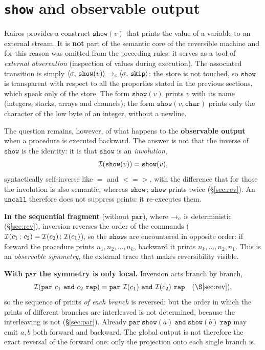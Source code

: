 \section{\texttt{show} and observable output}
\label{sec:show}

Kairos provides a construct $\mathtt{show}(v)$ that prints the value of a
variable to an external stream. It is \textbf{not} part of the semantic core of the
reversible machine and for this reason was omitted from the preceding rules: it serves
as a tool of \emph{external observation} (inspection of values during
execution). The associated transition is simply
$\langle \sigma,\, \mathtt{show}(v) \rangle \to_c \langle \sigma,\, \mathtt{skip} \rangle$: the store is not touched,
so $\mathtt{show}$ is transparent with respect to all the properties stated
in the previous sections, which speak only of the store. The form $\mathtt{show}(v)$ prints
$v$ with its name (integers, stacks, arrays and channels); the form
$\mathtt{show}(v,\mathtt{char})$ prints only the character of the low byte of an
integer, without a newline.

\medskip
\noindent
The question remains, however, of what happens to the \textbf{observable output} when
a procedure is executed backward. The answer is not that the inverse of
$\mathtt{show}$ is the identity: it is that $\mathtt{show}$ is an \emph{involution},
\[
\mathcal{I}(\mathtt{show}(v)) = \mathtt{show}(v),
\]
syntactically self-inverse like $\mathbin{\hat{}\!=}$ and $\mathbin{<\!=\!>}$, with the difference that for those the involution is also semantic, whereas $\mathtt{show}\,;\,\mathtt{show}$ prints twice
(\S\ref{sec:rev}). An $\mathtt{uncall}$ therefore does not suppress prints: it
re-executes them.

\medskip
\noindent
\textbf{In the sequential fragment} (without $\mathtt{par}$), where $\to_c$ is
deterministic (\S\ref{sec:rev}), inversion reverses the order of the commands
($\mathcal{I}(c_1\,;\,c_2) = \mathcal{I}(c_2)\,;\,\mathcal{I}(c_1)$), so the $\mathtt{show}$s
are encountered in opposite order: if forward the procedure prints
$n_1, n_2, \dots, n_k$, backward it prints $n_k, \dots, n_2, n_1$. This is an
\emph{observable symmetry}, the external trace that makes
reversibility visible.

\medskip
\noindent
\textbf{With $\mathtt{par}$ the symmetry is only local.} Inversion acts
branch by branch,
\[
\Inv{\mathtt{par}\ c_1\ \mathtt{and}\ c_2\ \mathtt{rap}} =
\mathtt{par}\ \Inv{c_1}\ \mathtt{and}\ \Inv{c_2}\ \mathtt{rap}
\quad (\S\ref{sec:rev}),
\]
so the sequence of prints \emph{of each branch} is
reversed; but the order in which the prints of different branches are interleaved is
not determined, because the interleaving is not (\S\ref{sec:par}). Already
$\mathtt{par}\ \mathtt{show}(a)\ \mathtt{and}\ \mathtt{show}(b)\ \mathtt{rap}$
may emit $a,b$ both forward and backward. The global output is not
therefore the exact reversal of the forward one: only the projection onto
each single branch is.

